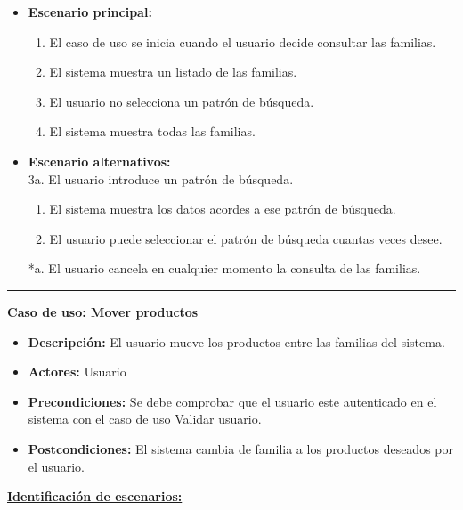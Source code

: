 \begin{itemize}\renewcommand{\labelitemi}{$\circ$}
 \item \textbf{Escenario principal:}
         \begin{enumerate}
          \item El caso de uso se inicia cuando el usuario decide consultar las familias.
          \item El sistema muestra un listado de las familias.
          \item El usuario no selecciona un patrón de búsqueda.
          \item El sistema muestra todas las familias.
         \end{enumerate}
  \item \textbf{Escenario alternativos:}\\
  			3a. El usuario introduce un patrón de búsqueda.
  			\begin{enumerate}
  			\item El sistema muestra los datos acordes a ese patrón de búsqueda.
  			\item El usuario puede seleccionar el patrón de búsqueda cuantas veces desee.
  			\end{enumerate}
          *a. El usuario cancela en cualquier momento la consulta de las familias.
\end{itemize}
\smallskip
\hrule height 1pt
\smallskip
\textbf{Caso de uso: Mover productos}
\begin{itemize}\renewcommand{\labelitemi}{$\cdot$}
 \item \textbf{Descripción:} El usuario mueve los productos entre las familias del sistema.
  \item \textbf{Actores:} Usuario
  \item \textbf{Precondiciones:} Se debe comprobar que el usuario este autenticado en el sistema con el caso de uso Validar usuario.
  \item \textbf{Postcondiciones:} El sistema cambia de familia a los productos deseados por el usuario.
\end{itemize}
\underline{\textbf{Identificación de escenarios:}}
